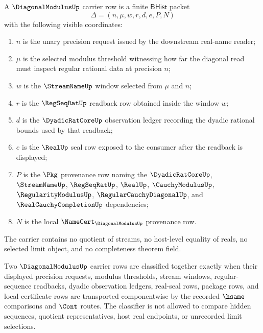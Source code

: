 \begin{definition}
\label{def:diagonalmodulus-carrier}
A $\DiagonalModulusUp$ carrier row is a finite $\mathsf{BHist}$ packet
$$
\Delta=(n,\mu,w,r,d,e,P,N)
$$
with the following visible coordinates:
\begin{enumerate}
\item $n$ is the unary precision request issued by the downstream real-name reader;
\item $\mu$ is the selected modulus threshold witnessing how far the diagonal read must inspect regular rational data at precision $n$;
\item $w$ is the $\StreamNameUp$ window selected from $\mu$ and $n$;
\item $r$ is the $\RegSeqRatUp$ readback row obtained inside the window $w$;
\item $d$ is the $\DyadicRatCoreUp$ observation ledger recording the dyadic rational bounds used by that readback;
\item $e$ is the $\RealUp$ seal row exposed to the consumer after the readback is displayed;
\item $P$ is the $\Pkg$ provenance row naming the $\DyadicRatCoreUp$, $\StreamNameUp$, $\RegSeqRatUp$, $\RealUp$, $\CauchyModulusUp$, $\RegularityModulusUp$, $\RegularCauchyDiagonalUp$, and $\RealCauchyCompletionUp$ dependencies;
\item $N$ is the local $\NameCert_{\DiagonalModulusUp}$ provenance row.
\end{enumerate}
The carrier contains no quotient of streams, no host-level equality of reals, no selected limit object, and no completeness theorem field.
\end{definition}

\begin{definition}
\label{def:diagonalmodulus-classifier}
Two $\DiagonalModulusUp$ carrier rows are classified together exactly when their displayed precision requests, modulus thresholds, stream windows, regular-sequence readbacks, dyadic observation ledgers, real-seal rows, package rows, and local certificate rows are transported componentwise by the recorded $\hsame$ comparisons and $\Cont$ routes. The classifier is not allowed to compare hidden sequences, quotient representatives, host real endpoints, or unrecorded limit selections.
\end{definition}

